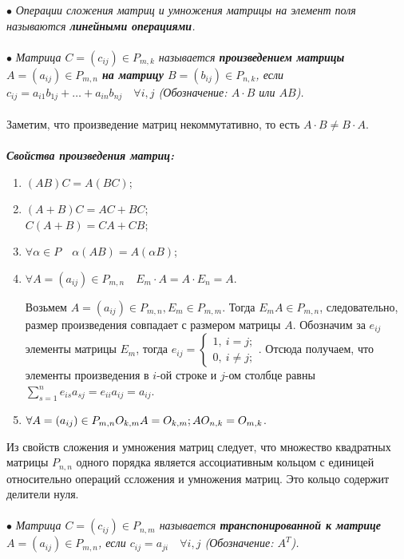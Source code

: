 $\bullet$ \textit{Операции сложения матриц и умножения матрицы на элемент поля называются \textbf{линейными операциями}.}\\\\
$\bullet$ \textit{Матрица $C = (c_{ij}) \in P_{m,k}$ называется \textbf{произведением матрицы} $A = (a_{ij}) \in P_{m,n}$ \textbf{на матрицу} $B = (b_{ij}) \in P_{n,k}$, если $c_{ij} = a_{i1}b_{1j} + \ldots + a_{in}b_{nj}\quad \forall i,j$ (Обозначение: $A\cdot B$ или $AB$).}\\\\
Заметим, что произведение матриц некоммутативно, то есть $A\cdot B \ne B\cdot A$.\\\\
\textbf{\textit{Свойства произведения матриц:}}\begin{enumerate}
	\item $(AB)C = A(BC)$;
	\item $(A+B)C = AC + BC$;\\
	$C(A+B) = CA + CB$;
	\item $\forall \alpha \in P\quad \alpha(AB) = A(\alpha B)$;
	\item $\forall A = (a_{ij}) \in P_{m,n}\quad E_m\cdot A = A\cdot E_n = A.$
	\begin{Proof}
		Возьмем $A = (a_{ij}) \in P_{m,n}, E_m \in P_{m,m}$. Тогда $E_mA \in P_{m,n}$, следовательно, размер произведения совпадает с размером матрицы $A$. Обозначим за $e_{ij}$ элементы матрицы $E_m$, тогда $e_{ij} = \begin{cases}
			1,\ i=j;\\
			0,\ i\ne j;
		\end{cases}$. Отсюда получаем, что элементы произведения в $i$-ой строке и $j$-ом столбце равны $\sum_{s=1}^{n}e_{is}a_{sj} = e_{ii}a_{ij} = a_{ij}$.
	\end{Proof}
	\item $\forall A = (a_{ij}) \in P_{m,n}\\ O_{k,m}A = O_{k,m};\\ AO_{n,k} = O_{m,k}$.
\end{enumerate}
Из свойств сложения и умножения матриц следует, что множество квадратных матрицы $P_{n,n}$ одного порядка является ассоциативным кольцом с единицей относительно операций ссложения и умножения матриц. Это кольцо содержит делители нуля.\\\\
$\bullet$ \textit{Матрица $C = (c_{ij})\in P_{n,m}$ называется \textbf{транспонированной к матрице} $A = (a_{ij})\in P_{m,n}$, если $c_{ij} = a_{ji}\quad \forall i,j$ (Обозначение: $A^T$).}\\\\
